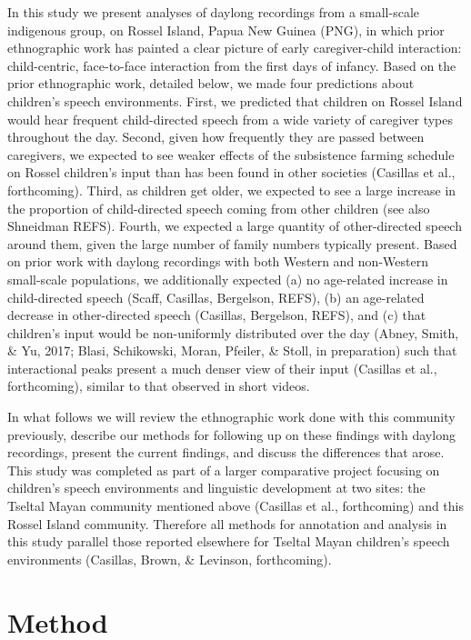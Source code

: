 \documentclass[,man,floatsintext]{apa6}
\begin{document}
In this study we present analyses of daylong recordings from a
small-scale indigenous group, on Rossel Island, Papua New Guinea (PNG),
in which prior ethnographic work has painted a clear picture of early
caregiver-child interaction: child-centric, face-to-face interaction
from the first days of infancy. Based on the prior ethnographic work,
detailed below, we made four predictions about children's speech
environments. First, we predicted that children on Rossel Island would
hear frequent child-directed speech from a wide variety of caregiver
types throughout the day. Second, given how frequently they are passed
between caregivers, we expected to see weaker effects of the subsistence
farming schedule on Rossel children's input than has been found in other
societies (Casillas et al., forthcoming). Third, as children get older,
we expected to see a large increase in the proportion of child-directed
speech coming from other children (see also Shneidman REFS). Fourth, we
expected a large quantity of other-directed speech around them, given
the large number of family numbers typically present. Based on prior
work with daylong recordings with both Western and non-Western
small-scale populations, we additionally expected (a) no age-related
increase in child-directed speech (Scaff, Casillas, Bergelson, REFS),
(b) an age-related decrease in other-directed speech (Casillas,
Bergelson, REFS), and (c) that children's input would be non-uniformly
distributed over the day (Abney, Smith, \& Yu, 2017; Blasi, Schikowski,
Moran, Pfeiler, \& Stoll, in preparation) such that interactional peaks
present a much denser view of their input (Casillas et al.,
forthcoming), similar to that observed in short videos.

In what follows we will review the ethnographic work done with this
community previously, describe our methods for following up on these
findings with daylong recordings, present the current findings, and
discuss the differences that arose. This study was completed as part of
a larger comparative project focusing on children's speech environments
and linguistic development at two sites: the Tseltal Mayan community
mentioned above (Casillas et al., forthcoming) and this Rossel Island
community. Therefore all methods for annotation and analysis in this
study parallel those reported elsewhere for Tseltal Mayan children's
speech environments (Casillas, Brown, \& Levinson, forthcoming).

\section{Method}\label{methods}
\end{document}
